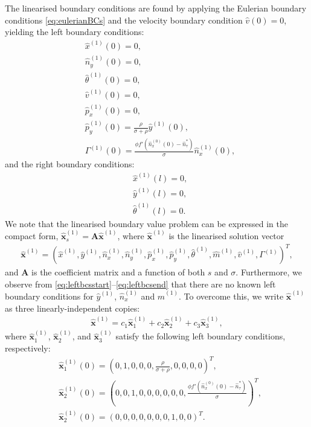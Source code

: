 The linearised boundary conditions are found by applying the Eulerian boundary conditions \eqref{eq:eulerianBCs} and the velocity boundary condition $\hat{v}(0) = 0$, yielding the left boundary conditions:
\begin{align}
&\hat{x}^{(1)}(0) = 0,\label{eq:leftbcsstart}\\
&\hat{n}_y^{(1)}(0) = 0,\\
&\hat{\theta}^{(1)}(0) = 0,\\
&\hat{v}^{(1)}(0) = 0,\\
&\hat{p}_x^{(1)}(0) = 0,\\
&\hat{p}_y^{(1)}(0)= \frac{\rho}{\sigma + \rho}\hat{y}^{(1)}(0),\\
& \Gamma^{(1)}(0) = \frac{\phi f'(\hat{n}_x^{(0)}(0) - \hat{n}_\tau^*)}{\sigma}\hat{n}_x^{(1)}(0),\label{eq:leftbcsend}
\end{align}
and the right boundary conditions:
\begin{align}
&\hat{x}^{(1)}(l) = 0,\label{eq:rightbcsstart}\\
&\hat{y}^{(1)}(l) = 0,\\
&\hat{\theta}^{(1)}(l) = 0.\label{eq:rightbcsend}
\end{align}
We note that the linearised boundary value problem can be expressed in the compact form, $\hat{\mathbf{x}}_s^{(1)} = \mathbf{A}\hat{\mathbf{x}}^{(1)}$, where $\hat{\mathbf{x}}^{(1)}$ is the linearised solution vector
\begin{align}
\hat{\mathbf{x}}^{(1)} =\left(\hat{x}^{(1)},\hat{y}^{(1)},\hat{n}_x^{(1)},\hat{n}^{(1)}_y,\hat{p}^{(1)}_x,\hat{p}^{(1)}_y,\hat{\theta}^{(1)},\hat{m}^{(1)},\hat{v}^{(1)},\Gamma^{(1)}\right)^T\nonumber,
\end{align}
and $\mathbf{A}$ is the coefficient matrix and a function of both $s$ and $\sigma$. Furthermore, we observe from \eqref{eq:leftbcsstart}--\eqref{eq:leftbcsend} that there are no known left boundary conditions for $\hat{y}^{(1)}$, $\hat{n}_x^{(1)}$ and $\hat{m}^{(1)}$. To overcome this, we write $\hat{\mathbf{x}}^{(1)}$ as three linearly-independent copies:
\begin{align}
\hat{\mathbf{x}}^{(1)} = c_1\hat{\mathbf{x}}_1^{(1)} + c_2\hat{\mathbf{x}}_2^{(1)} + c_3\hat{\mathbf{x}}_3^{(1)},
\end{align}
where $\hat{\mathbf{x}}_1^{(1)}$, $\hat{\mathbf{x}}_2^{(1)}$, and $\hat{\mathbf{x}}_3^{(1)}$ satisfy the following left boundary conditions, respectively:
\begin{align}
&\hat{\mathbf{x}}_1^{(1)}(0) =\left(0,1,0,0,0, \frac{\rho}{\sigma + \rho}, 0, 0, 0, 0\right)^T,\nonumber\\
&\hat{\mathbf{x}}_2^{(1)}(0) =\left(0,0,1,0,0, 0, 0, 0, 0, \frac{\phi f'(\hat{n}_x^{(0)}(0) - \hat{n}_\tau^*)}{\sigma}\right)^T,\nonumber\\
&\hat{\mathbf{x}}_2^{(1)}(0) =\left(0,0,0,0,0, 0, 0, 1, 0, 0\right)^T.
\end{align}
